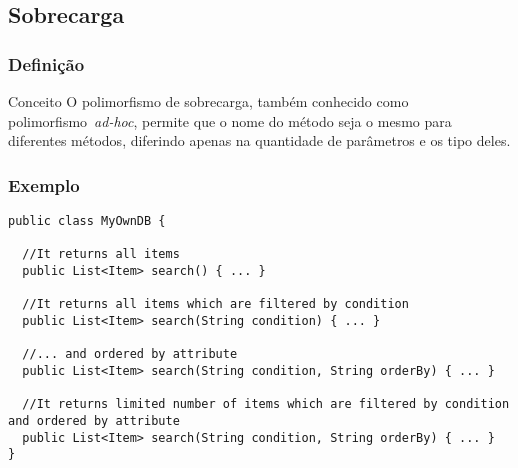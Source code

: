 \subsection{Sobrecarga}

\begin{frame}
\frametitle{Definição}
\justifying
\begin{block}{Conceito}
\qquad O polimorfismo de sobrecarga, também conhecido como polimorfismo~\emph{ad-hoc}, permite que o nome do método seja o mesmo para diferentes métodos, diferindo apenas na quantidade de parâmetros e os tipo deles.
\end{block}
\end{frame}

\begin{frame}[fragile]
\frametitle{Exemplo}
\justifying
\begin{lstlisting}
public class MyOwnDB {
	
  //It returns all items
  public List<Item> search() { ... } 

  //It returns all items which are filtered by condition
  public List<Item> search(String condition) { ... } 
  
  //... and ordered by attribute
  public List<Item> search(String condition, String orderBy) { ... } 
  
  //It returns limited number of items which are filtered by condition and ordered by attribute
  public List<Item> search(String condition, String orderBy) { ... } 
}
\end{lstlisting}
\end{frame}